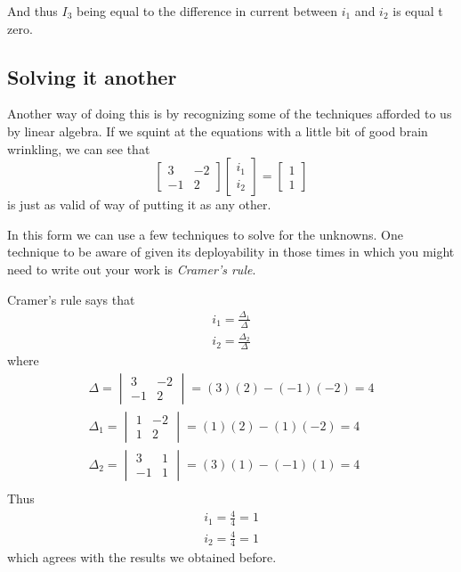 \documentclass[11pt]{book}
\begin{document}
And thus $I_3$ being equal to the difference in current between $i_1$ and $i_2$ is equal t zero.


\subsection{Solving it another}
Another way of doing this is by recognizing some of the techniques afforded to us by linear algebra. If we squint at the equations with a little bit of good brain wrinkling, we can see that 
\begin{equation}
	\begin{bmatrix}
		3 & -2 \\ -1 & 2
	\end{bmatrix}
	\begin{bmatrix}
		i_1 \\ i_2
	\end{bmatrix}
	=
	\begin{bmatrix}
		1 \\ 1
	\end{bmatrix}
\end{equation}
is just as valid of way of putting it as any other.

In this form we can use a few techniques to solve for the unknowns. One technique to be aware of given its deployability in those times in which you might need to write out your work is \textit{Cramer's rule}.

Cramer's rule says that 
\begin{eqnarray}
	i_1 = \frac{\Delta_1}{\Delta} \\
	i_2 = \frac{\Delta_2}{\Delta}
\end{eqnarray}
where
\begin{eqnarray}
	\Delta = 
	\begin{vmatrix}
		3 & -2 \\ -1 & 2
	\end{vmatrix}
	= (3)(2) - (-1)(-2) = 4 \\
	\Delta_1 = 
	\begin{vmatrix}
		1 & -2 \\ 1 & 2
	\end{vmatrix}
	= (1)(2) - (1)(-2) = 4 \\
	\Delta_2 = 
	\begin{vmatrix}
		3 & 1 \\ -1 & 1
	\end{vmatrix}
	= (3)(1) - (-1)(1) = 4 \\
\end{eqnarray}
Thus
\begin{eqnarray}
	i_1 = \frac{4}{4} = 1 \\
	i_2 = \frac{4}{4} = 1
\end{eqnarray}
which agrees with the results we obtained before.
\end{document}
